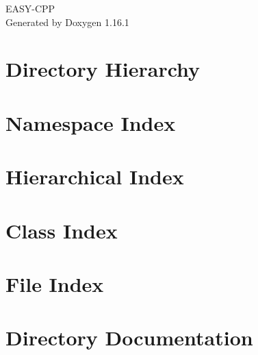 \documentclass[twoside]{book}
\newcommand{\+}{\discretionary{\mbox{\scriptsize$\hookleftarrow$}}{}{}}
\newcommand{\clearemptydoublepage}{%
    \newpage{\pagestyle{empty}\cleardoublepage}%
  }
\begin{document}
  \raggedbottom
    \hypersetup{pageanchor=false,
                bookmarksnumbered=true,
                pdfencoding=unicode
               }
  \begin{titlepage}
  \vspace*{7cm}
  \begin{center}%
  {\Large EASY-\/\+CPP}\\
  \vspace*{1cm}
  {\large Generated by Doxygen 1.16.1}\\
  \end{center}
  \end{titlepage}
  \clearemptydoublepage
  \tableofcontents
  \clearemptydoublepage
  \hypersetup{pageanchor=true}







\chapter{Directory Hierarchy}

\chapter{Namespace Index}

\chapter{Hierarchical Index}

\chapter{Class Index}

\chapter{File Index}

\chapter{Directory Documentation}





\end{document}
